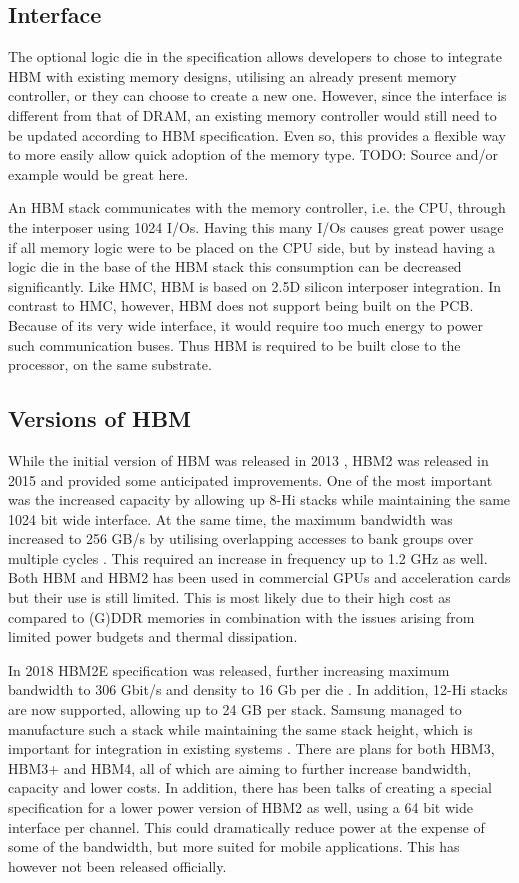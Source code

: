 \subsection{Interface}
The optional logic die in the specification allows developers to chose to integrate HBM with existing memory designs, utilising an already present memory controller, or they can choose to create a new one. However, since the interface is different from that of DRAM, an existing memory controller would still need to be updated according to HBM specification. Even so, this provides a flexible way to more easily allow quick adoption of the memory type. TODO: Source and/or example would be great here.
\bigskip

An HBM stack communicates with the memory controller, i.e. the CPU, through the interposer using 1024 I/Os. Having this many I/Os causes great power usage if all memory logic were to be placed on the CPU side, but by instead having a logic die in the base of the HBM stack this consumption can be decreased significantly. Like HMC, HBM is based on 2.5D silicon interposer integration. In contrast to HMC, however, HBM does not support being built on the PCB. Because of its very wide interface, it would require too much energy to power such communication buses. Thus HBM is required to be built close to the processor, on the same substrate.

\subsection{Versions of HBM}
While the initial version of HBM was released in 2013 \cite{standard2013high}, HBM2 was released in 2015 \cite{standard2015high} and provided some anticipated improvements. One of the most important was the increased capacity by allowing up 8-Hi stacks while maintaining the same 1024 bit wide interface. At the same time, the maximum bandwidth was increased to 256 GB/s by utilising overlapping accesses to bank groups over multiple cycles \cite{O'Connor:2017:FDE:3123939.3124545}. This required an increase in frequency up to 1.2 GHz as well. Both HBM and HBM2 has been used in commercial GPUs and acceleration cards but their use is still limited. This is most likely due to their high cost as compared to (G)DDR memories in combination with the issues arising from limited power budgets and thermal dissipation.
\bigskip

In 2018 HBM2E specification was released, further increasing maximum bandwidth to 306 Gbit/s and density to 16 Gb per die \cite{standard2018highe}. In addition, 12-Hi stacks are now supported, allowing up to 24 GB per stack. Samsung managed to manufacture such a stack while maintaining the same stack height, which is important for integration in existing systems \cite{liu_2019}. There are plans for both HBM3, HBM3+ and HBM4, all of which are aiming to further increase bandwidth, capacity and lower costs. In addition, there has been talks of creating a special specification for a lower power version of HBM2 as well, using a 64 bit wide interface per channel. This could dramatically reduce power at the expense of some of the bandwidth, but more suited for mobile applications. This has however not been released officially. 


